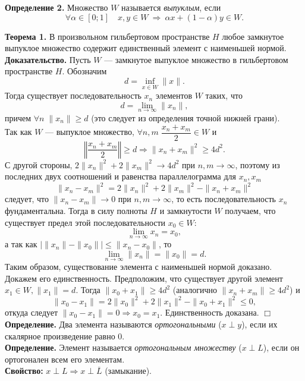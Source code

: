 \documentclass[12pt,a4paper, titlepage]{article}
\begin{document}
\textbf{Определение 2.} Множество $W$ называется \textit{выпуклым}, если
$$
\forall \alpha \in [0; 1] \quad x, y \in W \ \Rightarrow \ \alpha x + (1 - \alpha) y \in W.
$$

\textbf{Теорема 1.} В произвольном гильбертовом пространстве $H$ любое замкнутое выпуклое множество содержит единственный элемент с наименьшей нормой.\\

\textbf{Доказательство.} Пусть $W$ --- замкнутое выпуклое множество в гильбертовом пространстве $H$. Обозначим
$$
d = \inf_{x \in W} \|x\|.
$$
Тогда существует последовательность ${x_n}$ элементов $W$ таких, что 
$$
d = \lim_{n \to \infty}\|x_n\|,
$$
причем $\forall n \; \|x_n\| \geqslant d$ (это следует из определения точной нижней грани).\\

Так как $W$ --- выпуклое множество, $\forall n, m \; \dfrac{x_n + x_m}{2} \in W$ и 
$$
\left\Vert \frac{x_n + x_m}{2} \right\Vert \geqslant d \Rightarrow \|x_n + x_m\|^2 \geqslant 4d^2.
$$
С другой стороны, $2\|x_n\|^2 + 2\|x_m\|^2 \to 4d^2$ при $n, m \to \infty$, поэтому из последних двух соотношений и равенства параллелограмма для $x_n, x_m$
$$
\|x_n - x_m\|^2 = 2\|x_n\|^2 + 2\|x_m\|^2 - \|x_n + x_m\|^2
$$
следует, что $\|x_n - x_m\| \to 0$ при $n, m \to \infty$, то есть последовательность ${x_n}$ фундаментальна. Тогда в силу полноты $H$ и замкнутости $W$ получаем, что существует предел этой последовательности $x_0 \in W$:
$$
\lim_{n \to \infty} x_n = x_0,
$$
а так как $|\|x_n\| - \|x_0\|| \leqslant \|x_n - x_0\|$, то
$$
\lim_{n \to \infty} \|x_n\| = \|x_0\| = d.
$$
Таким образом, существование элемента с наименьшей нормой доказано. Докажем его единственность. Предположим, что существует другой элемент $x_1 \in W, \|x_1\| = d$. Тогда $\|x_0 + x_1\| \geqslant 4d^2$ (аналогично $\|x_n + x_m\| \geqslant 4d^2$) и 
$$
\|x_0 - x_1\| = 2\|x_0\|^2 + 2\|x_1\|^2 - \|x_0 + x_1\|^2 \leqslant 0,
$$
откуда следует $\|x_0 - x_1\| = 0 \Rightarrow x_0 = x_1$. Единственность доказана. $\Box$\\

\textbf{Определение.} Два элемента называются \textit{ортогональными} ($x \perp y$), если их скалярное произведение равно 0. \\
\textbf{Определение.} Элемент называется \textit{ортогональным множеству} ($x \perp L$), если он ортогонален всем его элементам. \\
\textbf{Свойство:} $x \perp L \Rightarrow x \perp \overline{L}$ (замыкание).\\
\end{document}
